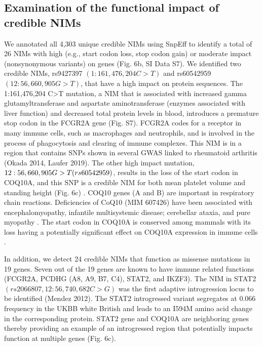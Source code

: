 \subsection{Examination of the functional impact of credible NIMs}
We annotated all 4,303 unique credible NIMs using SnpEff \cite{cingolani2012program} to identify a total of 26 NIMs with high (e.g., start codon loss, stop codon gain) or moderate impact (nonsynonymous variants) on genes (Fig. 6b, SI Data S7). We identified two credible NIMs, rs9427397 $(1:161,476,204 C>T)$ and rs60542959 $(12:56,660,905 G>T)$, that have a high impact on protein sequences. The 1:161,476,204 C>T mutation, a NIM that is associated with increased gamma glutamyltransferase and aspartate aminotransferase (enzymes associated with liver function) and decreased total protein levels in blood, introduces a premature stop codon in the FCGR2A gene (Fig. S7). FCGR2A codes for a receptor in many immune cells, such as macrophages and neutrophils, and is involved in the process of phagocytosis and clearing of immune complexes. This NIM is in a region that contains SNPs shown in several GWAS  linked to rheumatoid arthritis (Okada 2014, Laufer 2019). The other high impact mutation, $12:56,660,905\\ G>T (rs60542959)$, results in the loss of the start codon in COQ10A, and this SNP is a credible NIM for both mean platelet volume and standing height (Fig. 6c) . COQ10 genes (A and B) are important in respiratory chain reactions. Deficiencies of CoQ10 (MIM 607426) have been associated with encephalomyopathy, infantile multisystemic disease; cerebellar ataxia, and pure myopathy \cite{quinzii2008human}. The start codon in COQ10A is conserved among mammals with its loss having a potentially significant effect on COQ10A expression in immune cells \cite{kubota2020integrated}.

In addition, we detect 24 credible NIMs that function as missense mutations in 19 genes. Seven out of the 19 genes are known to have immune related functions (FCGR2A, PCDHG (A8, A9, B7, C4), STAT2, and IKZF3).  The NIM in STAT2 $(rs2066807, 12:56,740,682 C>G)$ was the first adaptive introgression locus to be identified (Mendez 2012). The STAT2 introgressed variant segregates at 0.066 frequency in the UKBB white British and leads to an I594M amino acid change in the corresponding protein. STAT2 gene and COQ10A are neighboring genes thereby providing an example of an introgressed region that potentially impacts function at multiple genes (Fig. 6c). 

